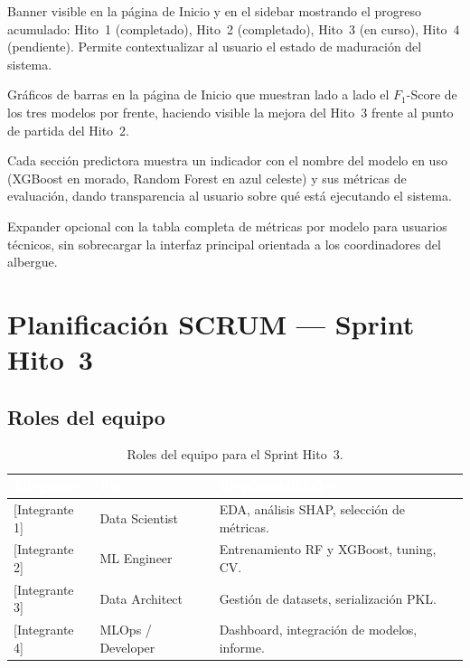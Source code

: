 \documentclass[12pt, a4paper]{article}
\begin{document}
\begin{description}[leftmargin=2em, labelindent=0.5em, itemsep=6pt]
  \item[\textbf{Indicador de fase del proyecto.}]
    Banner visible en la p\'agina de Inicio y en el sidebar mostrando el progreso acumulado: Hito~1 (completado), Hito~2 (completado), Hito~3 (en curso), Hito~4 (pendiente). Permite contextualizar al usuario el estado de maduraci\'on del sistema.

  \item[\textbf{Comparativa visual baseline vs.\ avanzados.}]
    Gr\'aficos de barras en la p\'agina de Inicio que muestran lado a lado el $F_1$-Score de los tres modelos por frente, haciendo visible la mejora del Hito~3 frente al punto de partida del Hito~2.

  \item[\textbf{Badge de modelo activo.}]
    Cada secci\'on predictora muestra un indicador con el nombre del modelo en uso (XGBoost en morado, Random Forest en azul celeste) y sus m\'etricas de evaluaci\'on, dando transparencia al usuario sobre qu\'e est\'a ejecutando el sistema.

  \item[\textbf{Panel expandible de m\'etricas.}]
    Expander opcional con la tabla completa de m\'etricas por modelo para usuarios t\'ecnicos, sin sobrecargar la interfaz principal orientada a los coordinadores del albergue.
\end{description}

\newpage

\section{Planificaci\'on SCRUM --- Sprint Hito~3}

\subsection{Roles del equipo}

\begin{table}[H]
\centering
\caption{Roles del equipo para el Sprint Hito~3.}
\begin{tabular}{L{4cm} L{3cm} L{6.2cm}}
  \toprule
  \textcolor{white}{\textbf{Integrante}} &
  \textcolor{white}{\textbf{Rol}} &
  \textcolor{white}{\textbf{Responsabilidades}} \\
  \midrule
  {[Integrante 1]} & Data Scientist    & EDA, an\'alisis SHAP, selecci\'on de m\'etricas. \\
  {[Integrante 2]} & ML Engineer       & Entrenamiento RF y XGBoost, tuning, CV. \\
  {[Integrante 3]} & Data Architect    & Gesti\'on de datasets, serializaci\'on PKL. \\
  {[Integrante 4]} & MLOps / Developer & Dashboard, integraci\'on de modelos, informe. \\
  \bottomrule
\end{tabular}
\end{table}
\end{document}

